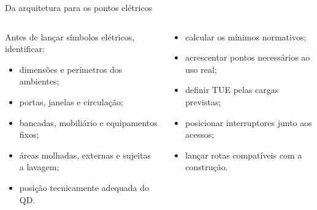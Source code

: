 \begin{frame}{Da arquitetura para os pontos elétricos}
\small
\begin{columns}[T,onlytextwidth]
\begin{caixaDef}[title=Levantamento]
Antes de lançar símbolos elétricos, identificar:
\begin{itemize}
\item dimensões e perímetros dos ambientes;
\item portas, janelas e circulação;
\item bancadas, mobiliário e equipamentos fixos;
\item áreas molhadas, externas e sujeitas a lavagem;
\item posição tecnicamente adequada do QD.
\end{itemize}
\end{caixaDef}
\begin{caixaProjeto}[title=Depois]
\begin{itemize}
\item calcular os mínimos normativos;
\item acrescentar pontos necessários ao uso real;
\item definir TUE pelas cargas previstas;
\item posicionar interruptores junto aos acessos;
\item lançar rotas compatíveis com a construção.
\end{itemize}
\end{caixaProjeto}
\end{columns}
\end{frame}

